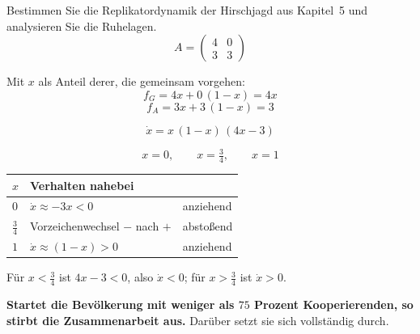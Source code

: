 \begin{aufgabe}
Bestimmen Sie die Replikatordynamik der Hirschjagd aus Kapitel~5 und analysieren Sie die Ruhelagen.
\[ A = \begin{pmatrix} 4 & 0\\ 3 & 3 \end{pmatrix} \]

\loesung
{}
Mit $x$ als Anteil derer, die gemeinsam vorgehen:
\[ f_G = 4x + 0\,(1-x) = 4x \]
\[ f_A = 3x + 3\,(1-x) = 3 \]

\[ \dot x = x\,(1-x)\,(4x-3) \]

\[ x = 0, \qquad x = \tfrac34, \qquad x = 1 \]

\begin{center}
{\small
\renewcommand{\arraystretch}{1.5}
\begin{tabular}{@{}P{1.4cm}P{3.4cm}P{2.2cm}@{}}
\toprule
$x$ & \textbf{Verhalten nahebei} & \\
\midrule
$0$ & $\dot x \approx -3x < 0$ & \textcolor{gruen}{anziehend}\\
$\tfrac34$ & Vorzeichen\-wechsel $-$ nach $+$ & \textcolor{akzent}{abstoßend}\\
$1$ & $\dot x \approx (1-x) > 0$ & \textcolor{gruen}{anziehend}\\
\bottomrule
\end{tabular}}
\end{center}

 Für $x < \tfrac34$ ist $4x-3 < 0$, also $\dot x < 0$; für $x > \tfrac34$ ist $\dot x > 0$.

\begin{center}
\begin{minipage}{0.9\textwidth}
\textbf{Startet die Bevölkerung mit weniger als $75$ Prozent Kooperierenden, so stirbt die Zusammenarbeit aus.} Darüber setzt sie sich vollständig durch.
\end{minipage}
\end{center}

\begin{center}
\begin{minipage}{0.88\textwidth}
\end{minipage}
\end{center}


\end{aufgabe}
